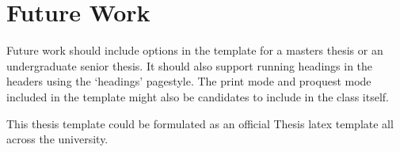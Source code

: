 \section{Future Work}

Future work should include options in the template for a masters thesis or an undergraduate senior thesis. It should also support running headings in the headers using the `headings' pagestyle.  The print mode and proquest mode included in the template might also be candidates to include in the class itself. 

 This thesis template could be formulated as an official Thesis latex template all across the university.
